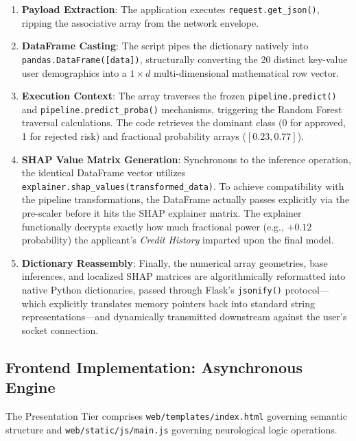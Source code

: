 \begin{enumerate}
\def\labelenumi{\arabic{enumi}.}
\tightlist
\item
  \textbf{Payload Extraction}: The application executes
  \texttt{request.get\_json()}, ripping the associative array from the
  network envelope.
\item
  \textbf{DataFrame Casting}: The script pipes the dictionary natively
  into \texttt{pandas.DataFrame({[}data{]})}, structurally converting
  the 20 distinct key-value user demographics into a \(1 \times d\)
  multi-dimensional mathematical row vector.
\item
  \textbf{Execution Context}: The array traverses the frozen
  \texttt{pipeline.predict()} and \texttt{pipeline.predict\_proba()}
  mechanisms, triggering the Random Forest traversal calculations. The
  code retrieves the dominant class (0 for approved, 1 for rejected
  risk) and fractional probability arrays (\([0.23, 0.77]\)).
\item
  \textbf{SHAP Value Matrix Generation}: Synchronous to the inference
  operation, the identical DataFrame vector utilizes
  \texttt{explainer.shap\_values(transformed\_data)}. To achieve
  compatibility with the pipeline transformations, the DataFrame
  actually passes explicitly via the pre-scaler before it hits the SHAP
  explainer matrix. The explainer functionally decrypts exactly how much
  fractional power (e.g., \(+0.12\) probability) the applicant's
  \emph{Credit History} imparted upon the final model.
\item
  \textbf{Dictionary Reassembly}: Finally, the numerical array
  geometries, base inferences, and localized SHAP matrices are
  algorithmically reformatted into native Python dictionaries, passed
  through Flask's \texttt{jsonify()} protocol---which explicitly
  translates memory pointers back into standard string
  representations---and dynamically transmitted downstream against the
  user's socket connection.
\end{enumerate}

\hypertarget{frontend-implementation-asynchronous-engine}{%
\subsection{Frontend Implementation: Asynchronous
Engine}\label{frontend-implementation-asynchronous-engine}}

The Presentation Tier comprises \texttt{web/templates/index.html}
governing semantic structure and \texttt{web/static/js/main.js}
governing neurological logic operations.

